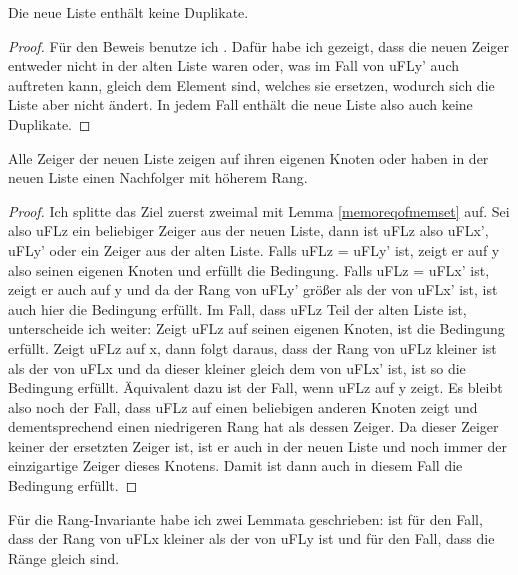 \begin{lemma}[\KruskalupdateunionFindnodup]
  Die neue Liste enthält keine Duplikate.
\end{lemma}
\begin{proof}
  Für den Beweis benutze ich \nodupsetofnotmem.
  Dafür habe ich gezeigt, dass die neuen Zeiger entweder nicht in der alten Liste waren oder,
  was im Fall von uFLy' auch auftreten kann, gleich dem Element sind, welches sie ersetzen, wodurch sich die Liste aber nicht ändert.
  In jedem Fall enthält die neue Liste also auch keine Duplikate.
\end{proof}

\begin{lemma}[\KruskalupdateunionFindmatchingrank]
  Alle Zeiger der neuen Liste zeigen auf ihren eigenen Knoten oder haben in der neuen Liste einen Nachfolger mit höherem Rang.
\end{lemma}
\begin{proof}
  Ich splitte das Ziel zuerst zweimal mit Lemma \ref{memoreqofmemset} auf.
  Sei also uFLz ein beliebiger Zeiger aus der neuen Liste, dann ist uFLz also uFLx', uFLy' oder ein Zeiger aus der alten Liste.
  Falls uFLz = uFLy' ist, zeigt er auf y also seinen eigenen Knoten und erfüllt die Bedingung.
  Falls uFLz = uFLx' ist, zeigt er auch auf y und da der Rang von uFLy' größer als der von uFLx' ist, ist auch hier die Bedingung erfüllt.
  Im Fall, dass uFLz Teil der alten Liste ist, unterscheide ich weiter:
  Zeigt uFLz auf seinen eigenen Knoten, ist die Bedingung erfüllt.
  Zeigt uFLz auf x, dann folgt daraus, dass der Rang von uFLz kleiner ist als der von uFLx 
  und da dieser kleiner gleich dem von uFLx' ist, ist so die Bedingung erfüllt.
  Äquivalent dazu ist der Fall, wenn uFLz auf y zeigt.
  Es bleibt also noch der Fall, dass uFLz auf einen beliebigen anderen Knoten zeigt und dementsprechend einen niedrigeren Rang hat als dessen Zeiger.
  Da dieser Zeiger keiner der ersetzten Zeiger ist, ist er auch in der neuen Liste und noch immer der einzigartige Zeiger dieses Knotens.
  Damit ist dann auch in diesem Fall die Bedingung erfüllt.
\end{proof}

Für die Rang-Invariante habe ich zwei Lemmata geschrieben:
\KruskalupdateunionFindrankInvariant ist für den Fall, dass der Rang von uFLx kleiner als der von uFLy ist
und \KruskalupdateunionFindrankInvariantofrankeq für den Fall, dass die Ränge gleich sind.

